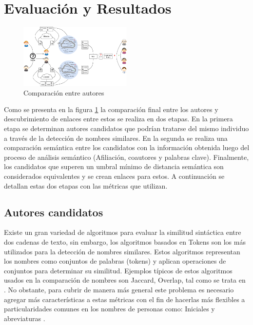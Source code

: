 \documentclass[conference]{IEEEtran}
\begin{document}
\section{Evaluación y Resultados}
\label{sec:evaluacion_resultados}

\begin{figure}[!t]
\centering
\includegraphics[width=0.5\textwidth]{proceso}
\caption{Comparaci\'on entre autores}
\label{fig:comparacion}
\end{figure}

Como se presenta en la figura \ref{fig:comparacion} la comparación final entre los autores y descubrimiento de enlaces entre estos se realiza en dos etapas. En la primera etapa se determinan autores candidatos que podrían tratarse del mismo individuo a través de la detección de nombres similares. En la segunda se realiza una comparación semántica entre los candidatos con la información obtenida luego del proceso de análisis semántico (Afiliación, coautores y palabras clave). Finalmente, los candidatos que superen un umbral mínimo de distancia semántica son considerados equivalentes y se crean enlaces para estos. A continuación se detallan estas dos etapas con las métricas que utilizan.

\subsection{Autores candidatos}
Existe un gran variedad de algoritmos para evaluar la similitud sintáctica entre dos cadenas de texto, sin embargo, los algoritmos basados en Tokens son los más utilizados para la detección de nombres similares. Estos algoritmos representan los nombres como conjuntos de palabras (tokens) y aplican operaciones de conjuntos para determinar su similitud. Ejemplos típicos de estos algoritmos usados en la comparación de nombres son Jaccard, Overlap, tal como se trata en  \cite{huynh2013vietnamese}. No obstante, para cubrir de manera más general este problema es necesario agregar más características a estas métricas con el fin de hacerlas más flexibles a particularidades comunes en los nombres de personas como: Iniciales y abreviaturas \cite{shoaib2015improving}.
\end{document}
